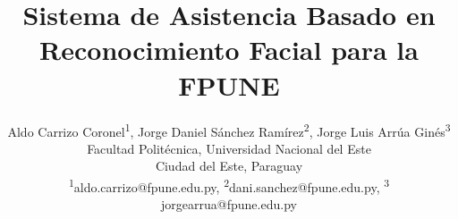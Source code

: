 \documentclass[10pt,a4paper]{article}
\begin{document}
\renewcommand{\tablename}{Tabla}
\renewcommand{\refname}{Referencias bibliográficas.}

\vspace{1cm}
\title{Sistema de Asistencia Basado en Reconocimiento Facial para la FPUNE}

\author{\small
Aldo Carrizo Coronel\textsuperscript{1},\; Jorge Daniel Sánchez Ramírez\textsuperscript{2},\; Jorge Luis Arrúa Ginés\textsuperscript{3}\\
\small Facultad Politécnica, Universidad Nacional del Este\\
\small Ciudad del Este, Paraguay\\
\small \textsuperscript{1}aldo.carrizo@fpune.edu.py,\; \textsuperscript{2}dani.sanchez@fpune.edu.py,\; \textsuperscript{3} jorgearrua@fpune.edu.py}
\date{}
\maketitle

\vspace*{-1cm}
\end{document}
